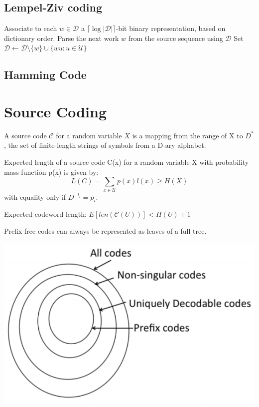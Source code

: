 \documentclass[10pt,a4paper,landscape]{article}
\newcommand{\code}{\mathcal{C}}
\newcommand{\alphabet}{\mathcal{U}}
\begin{document}
\begin{multicols*}{4}
\subsection{Lempel-Ziv coding}
\begin{algorithmic}[1]
	\State {Set $\mathcal D = \alphabet$}
	\Loop
		\State Associate to each $w \in \mathcal D$ a $\lceil \log | \mathcal D | \rceil$-bit binary representation, based on dictionary order.
		\State Parse the next work $w$ from the source sequence using $\mathcal D$
		\State Set $\mathcal D \gets \mathcal D \setminus \{w\} \cup \{ w u: u \in \alphabet \}$
	\EndLoop
\end{algorithmic}

\subsection{Hamming Code}

\section{Source Coding}
A source code $\code$ for a random variable $X$ is a mapping from the range of X to $D^*$, the set of finite-length strings of symbols from a D-ary alphabet.

Expected length of a source code C(x) for a random variable X with probability mass function p(x) is given by:
$$L(C) = \sum_{x \in \alphabet} p(x) l(x) \geq H(X)$$
with equality only if $D^{-l_i} = p_i$.

Expected codeword length: $E[len(\code(U))] < H(U) + 1$

Prefix-free codes can always be represented as leaves of a full tree.

\begin{colfig}
	\centering
	\includegraphics[width=\linewidth]{code-classes.png}
\end{colfig}


\end{multicols*}
\end{document}
